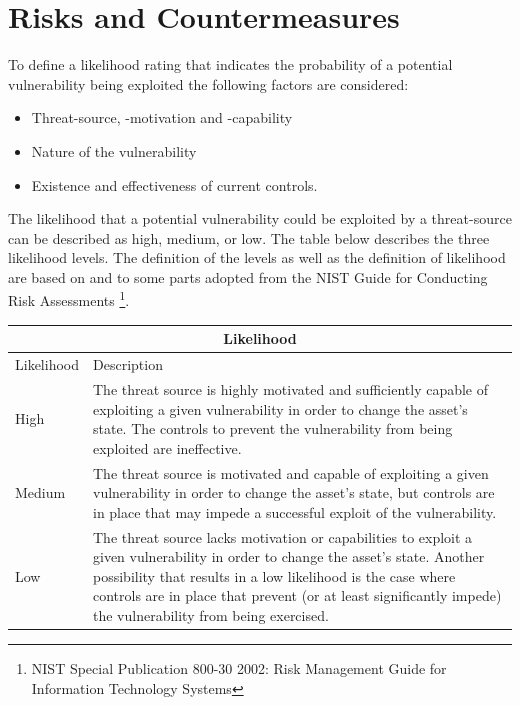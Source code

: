 \documentclass[a4paper, toc=index, 12pt, DIV14, twoside, BCOR2cm, headsepline, numbers=noenddot, bibliography=totoc]{scrbook}
\begin{document}
\section{Risks and Countermeasures}

To define a likelihood rating that indicates the probability of a potential vulnerability being exploited the following factors are considered:
\begin{itemize}
\item Threat-source, -motivation and -capability
\item Nature of the vulnerability
\item Existence and effectiveness of current controls.
\end{itemize}
The likelihood that a potential vulnerability could be exploited by a threat-source can be described as high, medium, or low. The table below describes the three likelihood levels. The definition of the levels as well as the definition of likelihood are based on and to some parts adopted from the NIST Guide for Conducting Risk Assessments \footnote{NIST Special Publication 800-30 2002: Risk Management Guide for Information Technology Systems}.

\begin{center}
\begin{tabular}{|l|p{10cm}|}
\hline
\multicolumn{2}{|c|}{\bf Likelihood} \\
\hline
Likelihood & Description \\
\hline
\hline
High   & \hspace*{20pt}
The threat source is highly motivated and sufficiently capable of exploiting a given vulnerability in order to change the asset's state. The controls to prevent the vulnerability from being exploited are ineffective. \\
\hline
Medium & \hspace*{20pt}
The threat source is motivated and capable of exploiting a given vulnerability in order to change the asset's state, but controls are in place that may impede a successful exploit of the vulnerability. \\
\hline
Low   & \hspace*{20pt}
The threat source lacks motivation or capabilities to exploit a given vulnerability in order to change the asset's state. Another possibility that results in a low likelihood is the case where controls are in place that prevent (or at least significantly impede) the vulnerability from being exercised. \\
\hline
\end{tabular}
\end{center}
\end{document}
